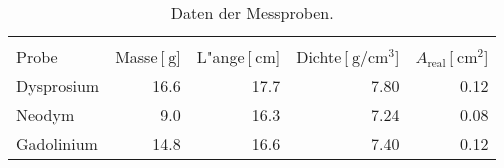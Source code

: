 
\begin{table}[!h]
\begin{center}
\begin{tabular}{|l|r|r|r|r|}
\hline
 & &&&\\
Probe & Masse\,[$\SI{}{\gram}$] & L"ange\,[$\SI{}{\centi\meter}$] & Dichte\,[$\SI{}{\gram\per\centi\meter^3}$] & $A_\mathrm{real}$\,[$\SI{}{\centi\meter^2}$]\\
\hline
\hline

Dysprosium & 16.6 & 17.7 & 7.80 & 0.12\\
Neodym     & 9.0  & 16.3 & 7.24 & 0.08\\
Gadolinium & 14.8 & 16.6 & 7.40 & 0.12\\

\hline
\end{tabular}
\caption{Daten der Messproben.}
\label{daten}
\end{center}
\end{table}